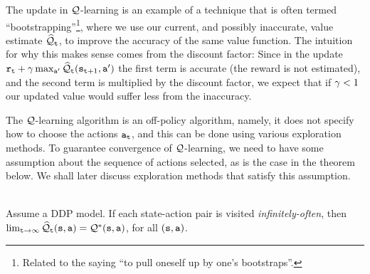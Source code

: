 The update in $\mathcal{Q}$-learning is an example of a technique that is often termed ``bootstrapping''\footnote{Related to the saying ``to pull oneself up by one's bootstraps''.}, where we use our current, and possibly inaccurate, value estimate $\widehat{\mathcal{Q}}_{\tt t}$, to improve the accuracy of the same value function. The intuition for why this makes sense comes from the discount factor: Since in the update ${\tt r}_{\tt t}+\gamma \max_{{\tt a}'}
\widehat{\mathcal{Q}}_{\tt t}({\tt s}_{{\tt t}+1},{\tt a}')$ the first term is accurate (the reward is not estimated), and the second term is multiplied by the discount factor, we expect that if $\gamma<1$ our updated value would suffer less from the inaccuracy. 

The $\mathcal{Q}$-learning algorithm is an off-policy algorithm, namely, it does not specify how to choose the actions
${\tt a}_{\tt t}$, and this can be done using various exploration methods.
To guarantee convergence of $\mathcal{Q}$-learning, we need to have some assumption about the
sequence of actions selected, as is the case in the theorem below. We shall later discuss exploration methods that satisfy this assumption.

\begin{theorem}\ \\
Assume a DDP model.
If each state-action pair is visited {\em infinitely-often}, then
$\lim_{{\tt t}\to\infty}\widehat{\mathcal{Q}}_{\tt t}({\tt s},{\tt a})=\mathcal{Q}^*({\tt s},{\tt a})$,
for all $({\tt s},{\tt a})$.
\end{theorem}

